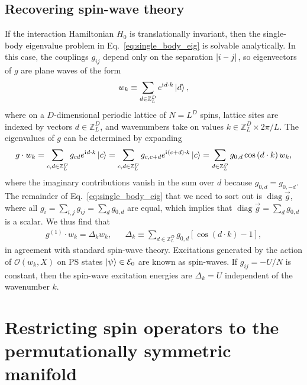 \documentclass[nofootinbib,twocolumn]{revtex4-2}
\newcommand{\p}[1]{\left(#1\right)} %
\renewcommand{\sp}[1]{\left[#1\right]} %
\renewcommand{\c}{\cdot} %
\renewcommand{\i}{\mathrm{i}\mkern1mu} %
\newcommand{\1}{\mathds{1}}
\newcommand{\ZZ}{\mathbb{Z}}
\newcommand{\E}{\mathcal{E}}
\renewcommand{\O}{\mathcal{O}}
\DeclareMathOperator{\diag}{diag}
\begin{document}
\subsection{Recovering spin-wave theory}

If the interaction Hamiltonian $H_0$ is translationally invariant, then the single-body eigenvalue problem in Eq.~\eqref{eq:single_body_eig} is solvable analytically.
In this case, the couplings $g_{ij}$ depend only on the separation $\abs{i-j}$, so eigenvectors of $g$ are plane waves of the form
\begin{align}
  w_k \equiv \sum_{d\in\ZZ_L^D} e^{\i d\c k} \ket{d},
\end{align}
where on a $D$-dimensional periodic lattice of $N=L^D$ spins, lattice sites are indexed by vectors $d\in\ZZ_L^D$, and wavenumbers take on values $k\in\ZZ_L^D\times2\pi/L$.
The eigenvalues of $g$ can be determined by expanding
\begin{align}
  g \c w_k
  = \sum_{c,d\in\ZZ_L^D} g_{cd} e^{\i d\c k} \ket{c}
  = \sum_{c,d\in\ZZ_L^D} g_{c,c+d} e^{\i\p{c+d}\c k} \ket{c}
  = \sum_{d\in\ZZ_L^D} g_{0,d} \cos\p{d\c k} w_k,
\end{align}
where the imaginary contributions vanish in the sum over $d$ because $g_{0,d}=g_{0,-d}$.
The remainder of Eq.~\eqref{eq:single_body_eig} that we need to sort out is $\diag\vec g$, where all $g_i = \sum_{i,j}g_{ij} = \sum_d g_{0,d}$ are equal, which implies that $\diag\vec g = \sum_d g_{0,d}$ is a scalar.
We thus find that
\begin{align}
  g^{(1)} \c w_k = \Delta_k w_k,
  &&
  \Delta_k \equiv \sum_{d\in\ZZ_L^D} g_{0,d} \sp{\cos\p{d\c k}-1},
\end{align}
in agreement with standard spin-wave theory.
Excitations generated by the action of $\O\p{w_k,X}$ on PS states $\ket\psi\in\E_0$ are known as spin-waves.
If $g_{ij}=-U/N$ is constant, then the spin-wave excitation energies are $\Delta_k=U$ independent of the wavenumber $k$.

\section{Restricting spin operators to the permutationally symmetric manifold}
\label{sec:PS_ops}
\end{document}
